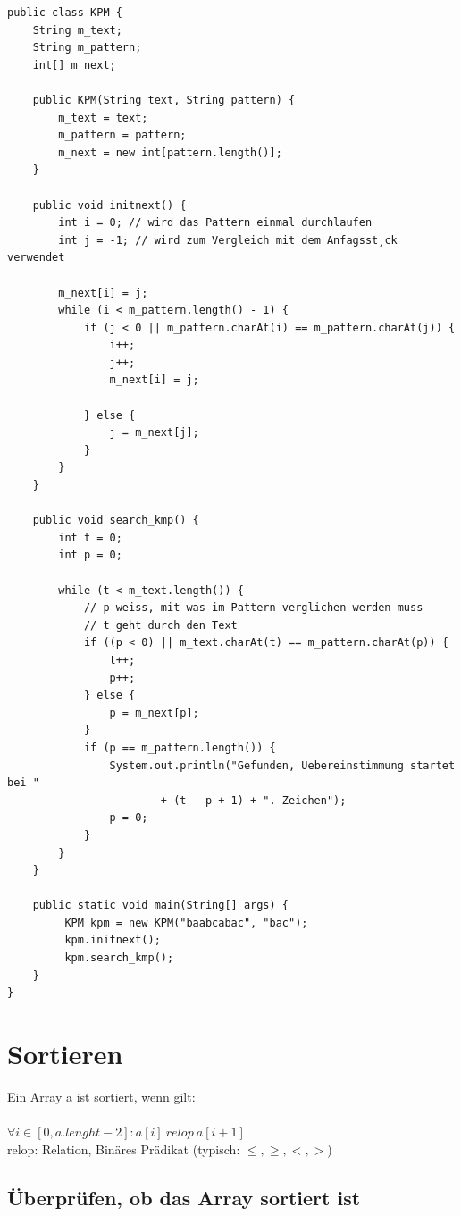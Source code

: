 \documentclass[a4paper,10pt]{article}
\begin{document}
\begin{lstlisting}
public class KPM {
    String m_text;
    String m_pattern;
    int[] m_next;

    public KPM(String text, String pattern) {
        m_text = text;
        m_pattern = pattern;
        m_next = new int[pattern.length()];
    }
    
    public void initnext() {
        int i = 0; // wird das Pattern einmal durchlaufen
        int j = -1; // wird zum Vergleich mit dem Anfagsst¸ck verwendet

        m_next[i] = j;
        while (i < m_pattern.length() - 1) {
            if (j < 0 || m_pattern.charAt(i) == m_pattern.charAt(j)) {
                i++;
                j++;
                m_next[i] = j;

            } else {
                j = m_next[j];
            }
        }
    }

    public void search_kmp() {
        int t = 0;
        int p = 0;

        while (t < m_text.length()) {
            // p weiss, mit was im Pattern verglichen werden muss
            // t geht durch den Text
            if ((p < 0) || m_text.charAt(t) == m_pattern.charAt(p)) {
                t++;
                p++;
            } else {
                p = m_next[p];
            }
            if (p == m_pattern.length()) {
                System.out.println("Gefunden, Uebereinstimmung startet bei "
                        + (t - p + 1) + ". Zeichen");
                p = 0;
            }
        }
    }   
    
    public static void main(String[] args) {
         KPM kpm = new KPM("baabcabac", "bac");
         kpm.initnext();
         kpm.search_kmp();
    }
}
\end{lstlisting}

\newpage
\section{Sortieren}
Ein Array a ist sortiert, wenn gilt: \\ \\
$ \forall i \in [0, a.lenght-2] : a[i]\ relop\ a[i+1]$ \\
relop: Relation, Bin\"ares Pr\"adikat (typisch: $\leq,\geq,<,>$)

\subsection{\"Uberpr\"ufen, ob das Array sortiert ist}
\end{document}
